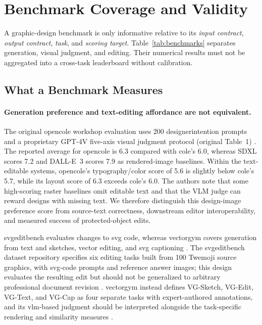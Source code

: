 \section{Benchmark Coverage and Validity}
\label{sec:benchmarks}
A graphic-design benchmark is only informative relative to its \emph{input contract}, \emph{output contract}, \emph{task}, and \emph{scoring target}.
Table~\ref{tab:benchmarks} separates generation, visual judgment, and editing.
Their numerical results must not be aggregated into a cross-task leaderboard without calibration.



\subsection{What a Benchmark Measures}
\paragraph{Generation preference and text-editing affordance are not equivalent.}
The original \ac{opencole} workshop evaluation uses 200 \ac{designerintention} prompts and a proprietary GPT-4V five-axis visual judgment protocol (original Table~1) \citep{opencole2024}.
The reported average for \ac{opencole} is 6.3 compared with \ac{cole}'s 6.0, whereas SDXL scores 7.2 and DALL-E~3 scores 7.9 as rendered-image baselines.
Within the text-editable systems, \ac{opencole}'s typography/color score of 5.6 is slightly below \ac{cole}'s 5.7, while its layout score of 6.3 exceeds \ac{cole}'s 6.0.
The authors note that some high-scoring raster baselines omit editable text and that the VLM judge can reward designs with missing text.
We therefore distinguish this design-image preference score from source-text correctness, downstream editor interoperability, and measured success of protected-object edits.

\ac{svgeditbench} evaluates changes to \ac{svg} code, whereas \ac{vectorgym} covers generation from text and sketches, vector editing, and \ac{svg} captioning \citep{svgeditbench2024,vectorgym2026}.
The \ac{svgeditbench} dataset repository specifies six editing tasks built from 100 Twemoji source graphics, with \ac{svg}-code prompts and reference answer images; this design evaluates the resulting edit but should not be generalized to arbitrary professional document revision \citep{svgeditbench2024}.
\ac{vectorgym} instead defines VG-Sketch, VG-Edit, VG-Text, and VG-Cap as four separate tasks with expert-authored annotations, and its \ac{vlm}-based judgment should be interpreted alongside the task-specific rendering and similarity measures \citep{vectorgym2026}.


